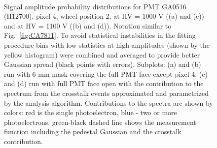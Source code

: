 \begin{figure}[h!bt] 
\centering 
   \\
  \caption{Signal amplitude probability distributions for PMT GA0516 (H12700), pixel 4, wheel position 2, at HV = 1000 V ((a) and (c)) and at HV = 1100 V ((b) and (d)). Notation similar to Fig.~\ref{fig:CA7811}. To avoid statistical instabilities in the fitting procedure bins with low statistics at high amplitudes (shown by the yellow histogram) were combined and averaged to provide better Gaussian spread (black points with errors).  Subplots: (a) and (b) run with 6 mm mask covering the full PMT face except pixel 4; (c) and (d) run with full PMT face open with the contribution to the spectrum from the crosstalk events approximated and parametrized by the analysis algorithm. Contributions to the spectra are shown by colors: red is the single photoelectron, blue - two or more photoelectrons, green-black dashed line shows the measurement function including the pedestal Gaussian and the crosstalk contribution. 
    }
\label{fig:GA0516_3}
\end{figure}
